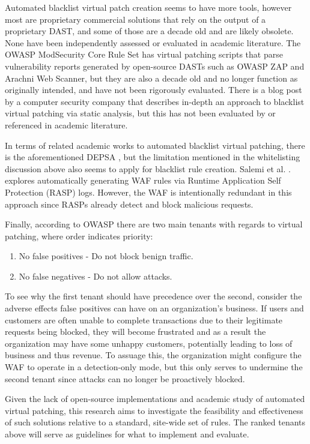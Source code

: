 Automated blacklist virtual patch creation seems to have more tools, however most are proprietary commercial solutions that rely on the output of a proprietary DAST, and some of those are a decade old and are likely obsolete. None have been independently assessed or evaluated in academic literature. The OWASP ModSecurity Core Rule Set has virtual patching scripts that parse vulnerability reports generated by open-source DASTs such as OWASP ZAP and Arachni Web Scanner, but they are also a decade old and no longer function as originally intended, and have not been rigorously evaluated. There is a blog post by a computer security company that describes in-depth an approach to blacklist virtual patching via static analysis, but this has not been evaluated by or referenced in academic literature.

In terms of related academic works to automated blacklist virtual patching, there is the aforementioned DEPSA \cite{betarte_towards_2016}, but the limitation mentioned in the whitelisting discussion above also seems to apply for blacklist rule creation. Salemi et al. \cite{waf_rasp}. explores automatically generating WAF rules via Runtime Application Self Protection (RASP) logs. However, the WAF is intentionally redundant in this approach since RASPs already detect and block malicious requests.

Finally, according to OWASP \cite{virtualpatchingcheat} there are two main tenants with regards to virtual patching, where order indicates priority:
\begin{enumerate}
\item No false positives - Do not block benign traffic.
\item No false negatives - Do not allow attacks.
\end{enumerate}

To see why the first tenant should have precedence over the second, consider the adverse effects false positives can have on an organization's business. If users and customers are often unable to complete transactions due to their legitimate requests being blocked, they will become frustrated and as a result the organization may have some unhappy customers, potentially leading to loss of business and thus revenue. To assuage this, the organization might configure the WAF to operate in a detection-only mode, but this only serves to undermine the second tenant since attacks can no longer be proactively blocked.

Given the lack of open-source implementations and academic study of automated virtual patching, this research aims to investigate the feasibility and effectiveness of such solutions relative to a standard, site-wide set of rules. The ranked tenants above will serve as guidelines for what to implement and evaluate.


